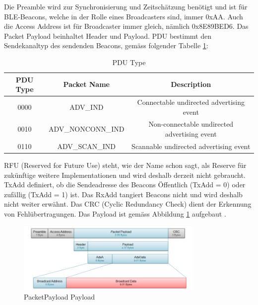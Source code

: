 Die Preamble wird zur Synchronisierung und Zeitschätzung benötigt und ist für BLE-Beacons, welche in der Rolle eines Broadcasters sind, immer 0xAA. Auch die Access Address ist für Broadcaster immer gleich, nämlich 0x8E89BED6. Das Packet Payload beinhaltet Header und Payload. PDU bestimmt den Sendekanaltyp des sendenden Beacons, gemäss folgender Tabelle \ref{tab:PDU}:

\begin{table}[htbp!!!]
\begin{tabular}{|c|c|c|}
\hline 
\rule[-1ex]{0pt}{2.5ex} PDU Type & Packet Name & Description \\ 
\hline 
\rule[-1ex]{0pt}{2.5ex} 0000 & ADV{\_}IND & Connectable undirected advertising event \\ 
\hline 
\rule[-1ex]{0pt}{2.5ex} 0010 & ADV{\_}NONCONN{\_}IND & Non-connectable undirected advertising event \\ 
\hline 
\rule[-1ex]{0pt}{2.5ex} 0110 & ADV{\_}SCAN{\_}IND & Scannable undirected advertising event \\ 
\hline 
\end{tabular} 
\caption[PDU Type]{PDU Type \cite{9_Teildokument_BT}}
\label{tab:PDU}
\end{table}

RFU (Reserved for Future Use) steht, wie der Name schon sagt, als Reserve für zukünftige weitere Implementationen und wird deshalb derzeit nicht gebraucht. TxAdd definiert, ob die Sendeadresse des Beacons Öffentlich (TxAdd = 0) oder zufällig (TxAdd = 1) ist. Das RxAdd tangiert Beacons nicht und wird deshalb nicht weiter erwähnt. Das CRC (Cyclic Redundancy Check) dient der Erkennung von Fehlübertragungen. Das Payload ist gemäss Abbildung \ref{fig:PacketPayload_Payload} aufgebaut \cite{9_Teildokument_BT}.

\begin{figure}[htbp!!!!]
	\begin{center}
		\includegraphics[width=0.8\textwidth]{data/PacketPayload_Payload.png}
		\caption[PacketPayload Payload]{PacketPayload Payload \cite{9_Teildokument_BT}} %
		\label{fig:PacketPayload_Payload}
	\end{center}
\end{figure}

